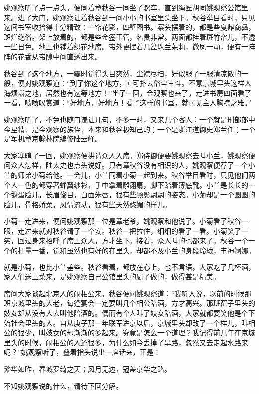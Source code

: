 \documentclass[12pt,UTF8]{ctexbook}
\begin{document}
{{{姚观察听了点一点头，便同着章秋谷一同坐了骡车，直到绳匠胡同姚观察公馆里来。进了大门，姚观察让着秋谷到一间小小的书室里头坐下。秋谷举目看时，只见这间书室收拾得十分精致：一帘花影，四壁图书。案头摆着的，都是些夏鼎商彝，斑烂绝俗。架上放着的，都是些金签玉管，名贵非常。两面都挂着斑竹帘儿，不透一些日色。地上也铺着织花地席。帘外更摆着几盆珠兰茉莉，微凤一动，便有一阵阵的花香从帘隙中间直透出来。

秋谷到了这个地方，一霎时觉得头目爽然，尘襟尽扫，好似服了一服清凉散的一般，便对姚观察道：“到了你这个地方，直可扑去俗尘三斗。不意京城里头这样人海烦嚣之地，居然也有这等地方！”坐了一回，金观察也来了，走进书房四面看了一看，啧喷叹赏道：“好地方，好地方！看了这样的书室，就可见主人胸襟之雅。”

姚观察听了，不免也随口谦让几句，不多一时，又来几个客人：一个就是刑部郎中金星精，是金观察的族侄，本来和秋谷极知己的；一个是浙江道御史郑兰任；一个是军机章京翰林院编修陆云峰。

大家塞暄了一回，姚观察便拱请众人入席。郑侍御便要姚观察去叫小兰，姚观察便问众人怎样，陆太史也点头说好。只有章秋谷没有相识的人，姚观察便荐了一个小兰的师弟小菊给他。一会儿，小兰同着小菊一起到来。秋谷举目看时，只见他们两个人一色的都穿著蝉翼纱衫，手中拿着雕翎扇，脚下踏着薄底靴。小兰是长长的一个鹅蛋脸儿，长眉俊目，白面朱唇，狠有些顾影翩翩的姿态。小菊却是一个圆圆的脸儿，骨格娇柔，风情流动，狠有些天然憨媚的样儿。

小菊一走进来，便问姚观察那一位是章老爷，姚观察和他说了。小菊看了秋谷一眼，走过来就对秋谷请了一个安。秋谷一把拉住，细细的看了一看。小菊笑了一笑，回过身来招呼了席上众人，方才坐下。接着，众人叫的也都来了。秋谷一个一个的打量一番，觉和虽然也有好的在里头，却都不及小兰的身段玲珑，丰神婀娜。

就是小菊，也比小兰差些。秋谷看着，都放在心上，也不言语。大家吃了几杯酒，家人们送上菜来，是姚观察自己公馆里头的厨子做的，做得甚是精美。

席间大家谈起北京人的闹相公来，秋谷便问姚观察道：“我听人说，以前的时候那班京城里头的大老，每逢宴会一定要叫几个相公陪酒，方才高兴。那班窑子里头的妓女却从没有人去叫他陪酒的。偶而有个人叫了妓女陪酒，大家就都要笑他是个下流社会里头的人。自从庚子那一年联军进京以后，京城里头却改了一个样儿，叫相公的狠少，叫妓女的却渐渐的多起来。究竟是怎么一个道理？我记得前几年在京城里头的时候，闹相公的人还狠多，为什么如今丢掉了旱路，忽然又去走起水路来呢？”姚观察听了，叠着指头说出一席话来，正是：

繁华如昨，春城罗绮之天；风月无边，冠盖京华之路。

不知姚观察说的什么，请待下回分解。





}}}
\end{document}
